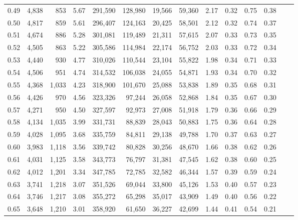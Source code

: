 \begin{tabular}{rrrrrrrrrrrrrr}
0.49 &  4,838 &    853 &     5.67 &  291,590 &  128,980 &  19,566 &  59,360 &  2.17 &  0.32 &  0.75 &      0.38 \\
0.50 &  4,817 &    859 &     5.61 &  296,407 &  124,163 &  20,425 &  58,501 &  2.12 &  0.32 &  0.74 &      0.37 \\
0.51 &  4,674 &    886 &     5.28 &  301,081 &  119,489 &  21,311 &  57,615 &  2.07 &  0.33 &  0.73 &      0.35 \\
0.52 &  4,505 &    863 &     5.22 &  305,586 &  114,984 &  22,174 &  56,752 &  2.03 &  0.33 &  0.72 &      0.34 \\
0.53 &  4,440 &    930 &     4.77 &  310,026 &  110,544 &  23,104 &  55,822 &  1.98 &  0.34 &  0.71 &      0.33 \\
0.54 &  4,506 &    951 &     4.74 &  314,532 &  106,038 &  24,055 &  54,871 &  1.93 &  0.34 &  0.70 &      0.32 \\
0.55 &  4,368 &  1,033 &     4.23 &  318,900 &  101,670 &  25,088 &  53,838 &  1.89 &  0.35 &  0.68 &      0.31 \\
0.56 &  4,426 &    970 &     4.56 &  323,326 &   97,244 &  26,058 &  52,868 &  1.84 &  0.35 &  0.67 &      0.30 \\
0.57 &  4,271 &    950 &     4.50 &  327,597 &   92,973 &  27,008 &  51,918 &  1.79 &  0.36 &  0.66 &      0.29 \\
0.58 &  4,134 &  1,035 &     3.99 &  331,731 &   88,839 &  28,043 &  50,883 &  1.75 &  0.36 &  0.64 &      0.28 \\
0.59 &  4,028 &  1,095 &     3.68 &  335,759 &   84,811 &  29,138 &  49,788 &  1.70 &  0.37 &  0.63 &      0.27 \\
0.60 &  3,983 &  1,118 &     3.56 &  339,742 &   80,828 &  30,256 &  48,670 &  1.66 &  0.38 &  0.62 &      0.26 \\
0.61 &  4,031 &  1,125 &     3.58 &  343,773 &   76,797 &  31,381 &  47,545 &  1.62 &  0.38 &  0.60 &      0.25 \\
0.62 &  4,012 &  1,201 &     3.34 &  347,785 &   72,785 &  32,582 &  46,344 &  1.57 &  0.39 &  0.59 &      0.24 \\
0.63 &  3,741 &  1,218 &     3.07 &  351,526 &   69,044 &  33,800 &  45,126 &  1.53 &  0.40 &  0.57 &      0.23 \\
0.64 &  3,746 &  1,217 &     3.08 &  355,272 &   65,298 &  35,017 &  43,909 &  1.49 &  0.40 &  0.56 &      0.22 \\
0.65 &  3,648 &  1,210 &     3.01 &  358,920 &   61,650 &  36,227 &  42,699 &  1.44 &  0.41 &  0.54 &      0.21 \\

\end{tabular}
